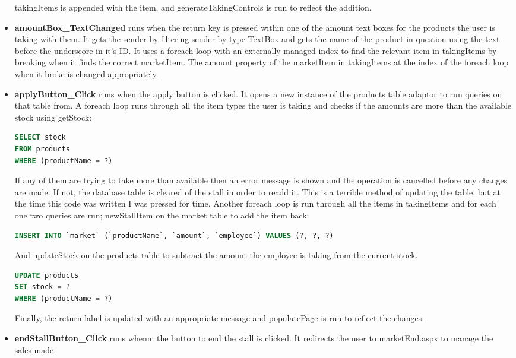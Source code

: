 ﻿\documentclass{article}
\begin{document}
\begin{itemize}
        takingItems is appended with the item, and generateTakingControls is run to reflect the addition.
        \item \textbf{amountBox\_TextChanged} runs when the return key is pressed within one of the amount text boxes for the products the user is taking with them.
        It gets the sender by filtering sender by type TextBox and gets the name of the product in question using the text before the underscore in it's ID.
        It uses a foreach loop with an externally managed index to find the relevant item in takingItems by breaking when it finds the correct marketItem.
        The amount property of the marketItem in takingItems at the index of the foreach loop when it broke is changed appropriately.
        \item \textbf{applyButton\_Click} runs when the apply button is clicked.
        It opens a new instance of the products table adaptor to run queries on that table from.
        A foreach loop runs through all the item types the user is taking and checks if the amounts are more than the available stock using getStock:
        \begin{lstlisting}[language=SQL]
SELECT stock
FROM products
WHERE (productName = ?)
        \end{lstlisting}
        If any of them are trying to take more than available then an error message is shown and the operation is cancelled before any changes are made.
        If not, the database table is cleared of the stall in order to readd it.
        This is a terrible method of updating the table, but at the time this code was written I was pressed for time.
        Another foreach loop is run through all the items in takingItems and for each one two queries are run; newStallItem on the market table to add the item back:
        \begin{lstlisting}[language=SQL]
INSERT INTO `market` (`productName`, `amount`, `employee`) VALUES (?, ?, ?)
        \end{lstlisting}
        And updateStock on the products table to subtract the amount the employee is taking from the current stock.
        \begin{lstlisting}[language=SQL]
UPDATE products
SET stock = ?
WHERE (productName = ?)
        \end{lstlisting}
        Finally, the return label is updated with an appropriate message and populatePage is run to reflect the changes.
        \item \textbf{endStallButton\_Click} runs whenm the button to end the stall is clicked.
        It redirects the user to marketEnd.aspx to manage the sales made.
    \end{itemize}
\end{document}
